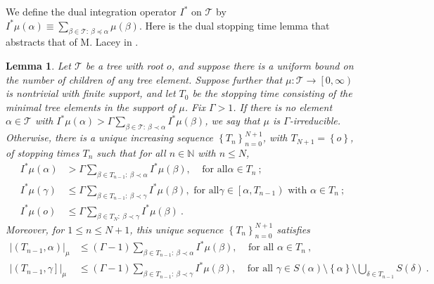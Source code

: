 \documentclass{amsart}%
\theoremstyle{plain}
\newtheorem{lemma}[theorem]{Lemma}
\numberwithin{equation}{section}
\begin{document}
We define the dual integration operator $I^{\ast}$ on $\mathcal{T}$ by
$I^{\ast}\mu\left(  \alpha\right)  \equiv\sum_{\beta\in\mathcal{T}%
:\ \beta\preccurlyeq\alpha}\mu\left(  \beta\right)  $. Here is the dual
stopping time lemma that abstracts that of M. Lacey in \cite{Lac}.

\begin{lemma}
\label{lem I*}Let $\mathcal{T}$ be a tree with root $o$, and suppose there is
a uniform bound on the number of children of any tree element. Suppose further
that $\mu:\mathcal{T}\rightarrow\left[  0,\infty\right)  $ is nontrivial with
finite support, and let $T_{0}$ be the stopping time consisting of the minimal
tree elements in the support of $\mu$. Fix $\Gamma>1$. If there is no element
$\alpha\in\mathcal{T}$ with $I^{\ast}\mu\left(  \alpha\right)  >\Gamma
\sum_{\beta\in\mathcal{T}:\ \beta\prec\alpha}I^{\ast}\mu\left(  \beta\right)
$, we say that $\mu$ is $\Gamma$-irreducible. Otherwise, there is a unique
increasing sequence $\left\{  T_{n}\right\}  _{n=0}^{N+1}$, with
$T_{N+1}=\left\{  o\right\}  $, of stopping times $T_{n}$ such that for all
$n\in\mathbb{N}$ with $n\leq N$,
\begin{align}
I^{\ast}\mu\left(  \alpha\right)   & >\Gamma\sum_{\beta\in T_{n-1}%
:\ \beta\prec\alpha}I^{\ast}\mu\left(  \beta\right)  ,\ \ \ \ \ \text{for all
}\alpha\in T_{n}\ ;\label{dec corona}\\
I^{\ast}\mu\left(  \gamma\right)   & \leq\Gamma\sum_{\beta\in T_{n-1}%
:\ \beta\prec\gamma}I^{\ast}\mu\left(  \beta\right)  ,\text{ \ \ \ \ for all
}\gamma\in\left[  \alpha,T_{n-1}\right)  \text{ with }\alpha\in T_{n}%
\ ;\nonumber\\
I^{\ast}\mu\left(  o\right)   & \leq\Gamma\sum_{\beta\in T_{N}:\ \beta
\prec\gamma}I^{\ast}\mu\left(  \beta\right)  \ .\nonumber
\end{align}
Moreover, for $1\leq n\leq N+1$, this unique sequence $\left\{  T_{n}\right\}
_{n=0}^{N+1}$ satisfies%
\begin{align}
\left\vert \left(  T_{n-1},\alpha\right)  \right\vert _{\mu}  & \leq\left(
\Gamma-1\right)  \sum_{\beta\in T_{n-1}:\ \beta\prec\alpha}I^{\ast}\mu\left(
\beta\right)  ,\ \ \ \ \ \text{for all }\alpha\in T_{n}%
\ ,\label{dec corona small}\\
\left\vert \left(  T_{n-1},\gamma\right]  \right\vert _{\mu}  & \leq\left(
\Gamma-1\right)  \sum_{\beta\in T_{n-1}:\ \beta\prec\gamma}I^{\ast}\mu\left(
\beta\right)  ,\ \ \ \ \ \text{for all }\gamma\in S\left(  \alpha\right)
\setminus\left\{  \alpha\right\}  \setminus\bigcup_{\delta\in T_{n-1}}S\left(
\delta\right)  \ .\nonumber
\end{align}

\end{lemma}
\end{document}
